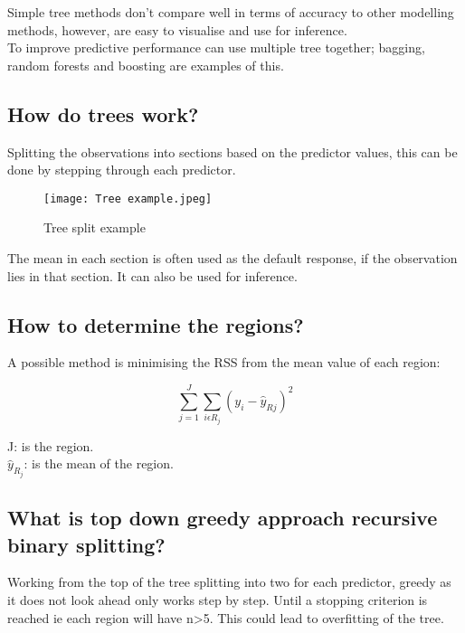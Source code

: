 \documentclass[11pt]{scrartcl} %
\begin{document}
Simple tree methods don't compare well in terms of accuracy to other modelling methods, however, are easy
to visualise and use for inference.\\

To improve predictive performance can use multiple tree together; bagging, random forests and boosting
are examples of this.

\subsection{How do trees work?}

Splitting the observations into sections based on the predictor values, this can be done by stepping
through each predictor.

\begin{figure}[h] %
	\centering
	\texttt{[image: Tree example.jpeg]} %
	\caption{Tree split example}
\end{figure}

The mean in each section is often used as the default response, if the observation lies in that section.
It can also be used for inference.

\subsection{How to determine the regions?}

A possible method is minimising the RSS from the mean value of each region:

\begin{equation}
	\sum^J_{j=1}\sum_{i\epsilon R_j}{(y_i-\hat{y}_{Rj})}^2
\end{equation}

J: is the region.\\
\(\hat{y}_{R_j}\): is the mean of the region.

\subsection{What is top down greedy approach recursive binary splitting?}

Working from the top of the tree splitting into two for each predictor, greedy as it does not
look ahead only works step by step. Until a stopping criterion is reached ie each region will have
n>5. This could lead to overfitting of the tree.
\end{document}
